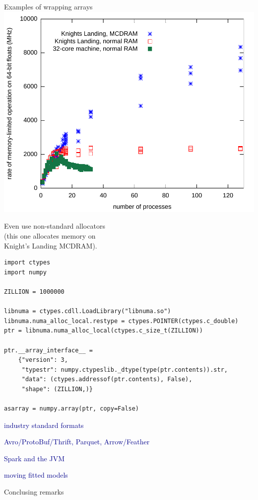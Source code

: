\documentclass{beamer}
\begin{document}
\begin{frame}[fragile]{Examples of wrapping arrays}
\vspace{0.5 cm}
\hfill \includegraphics[height=3.5 cm]{knl-scaling.pdf}

\vspace{-3.5 cm}
Even use non-standard allocators \\ (this one allocates memory on \\ Knight's Landing MCDRAM).

\vspace{0.25 cm}
\scriptsize
\begin{verbatim}
import ctypes
import numpy

ZILLION = 1000000

libnuma = ctypes.cdll.LoadLibrary("libnuma.so")
libnuma.numa_alloc_local.restype = ctypes.POINTER(ctypes.c_double)
ptr = libnuma.numa_alloc_local(ctypes.c_size_t(ZILLION))

ptr.__array_interface__ =
    {"version": 3,
     "typestr": numpy.ctypeslib._dtype(type(ptr.contents)).str,
     "data": (ctypes.addressof(ptr.contents), False),
     "shape": (ZILLION,)}

asarray = numpy.array(ptr, copy=False)
\end{verbatim}
\end{frame}



\begin{frame}{}
\begin{center}
\LARGE \textcolor{darkblue}{industry standard formats}

\vspace{0.25 cm}
\textcolor{darkblue}{\Large Avro/ProtoBuf/Thrift, Parquet, Arrow/Feather}
\end{center}
\end{frame}

\begin{frame}{}
\begin{center}
\LARGE \textcolor{darkblue}{Spark and the JVM}
\end{center}
\end{frame}

\begin{frame}{}
\begin{center}
\LARGE \textcolor{darkblue}{moving fitted models}
\end{center}
\end{frame}

\begin{frame}{Conclusing remarks}

\end{frame}
\end{document}
